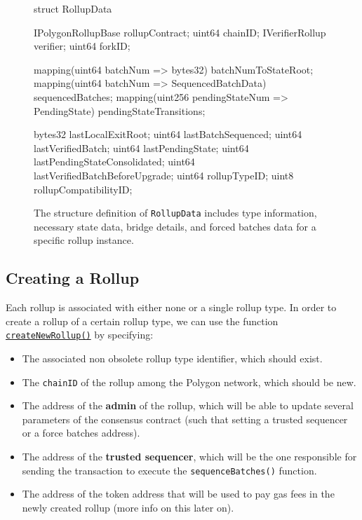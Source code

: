 \begin{figure}[h]
\begin{solidity}
struct RollupData {

  IPolygonRollupBase rollupContract;
  uint64 chainID;
  IVerifierRollup verifier;
  uint64 forkID;

  mapping(uint64 batchNum => bytes32)              batchNumToStateRoot;
  mapping(uint64 batchNum => SequencedBatchData)   sequencedBatches;
  mapping(uint256 pendingStateNum => PendingState) pendingStateTransitions;

  bytes32 lastLocalExitRoot;
  uint64  lastBatchSequenced;
  uint64  lastVerifiedBatch;
  uint64  lastPendingState;
  uint64  lastPendingStateConsolidated;
  uint64  lastVerifiedBatchBeforeUpgrade;
  uint64  rollupTypeID;
  uint8   rollupCompatibilityID;

}
\end{solidity}
\caption{The structure definition of \texttt{RollupData} includes type information, necessary state data, bridge details, and forced batches data for a specific rollup instance.}
\label{fig:rollup-data}
\end{figure}



\subsection{Creating a Rollup}

Each rollup is associated with either none or a single rollup type. In order to create a rollup of a certain rollup type, we can use the function \href{https://github.com/0xPolygonHermez/zkevm-contracts/blob/8fc03b0e83cbb143fdc6c1ecfaafa5c294c25509/contracts/v2/PolygonRollupManager.sol\#L559}{\texttt{createNewRollup()}} by specifying:

\begin{itemize}

\item The associated non obsolete rollup type identifier, which should exist.

\item The \texttt{chainID} of the rollup among the Polygon network, which should be new.

\item The address of the \textbf{admin} of the rollup, which will be able to update several parameters of the consensus contract (such that setting a trusted sequencer or a force batches address).

\item The address of the \textbf{trusted sequencer}, which will be the one responsible for sending the transaction to execute the \texttt{sequenceBatches()} function.

\item The address of the token address that will be used to pay gas fees in the newly created rollup (more info on this later on).

\end{itemize}

